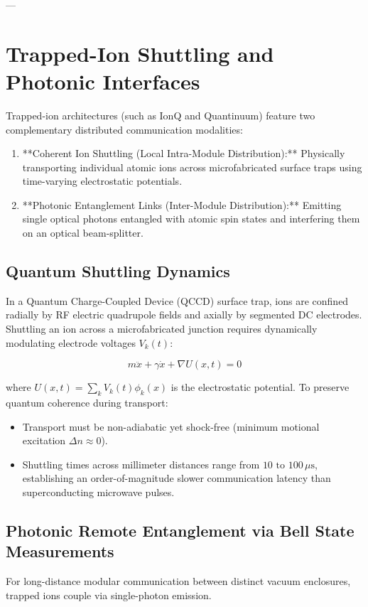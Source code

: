 ---

\section{Trapped-Ion Shuttling and Photonic Interfaces}

Trapped-ion architectures (such as IonQ and Quantinuum) feature two complementary distributed communication modalities:
\begin{enumerate}
    \item **Coherent Ion Shuttling (Local Intra-Module Distribution):** Physically transporting individual atomic ions across microfabricated surface traps using time-varying electrostatic potentials.
    \item **Photonic Entanglement Links (Inter-Module Distribution):** Emitting single optical photons entangled with atomic spin states and interfering them on an optical beam-splitter.
\end{enumerate}

\subsection{Quantum Shuttling Dynamics}
In a Quantum Charge-Coupled Device (QCCD) surface trap, ions are confined radially by RF electric quadrupole fields and axially by segmented DC electrodes. Shuttling an ion across a microfabricated junction requires dynamically modulating electrode voltages $V_k(t)$:

\begin{equation}
    m \ddot{x} + \gamma \dot{x} + \nabla U(x, t) = 0
\end{equation}

where $U(x, t) = \sum_k V_k(t) \phi_k(x)$ is the electrostatic potential. To preserve quantum coherence during transport:
\begin{itemize}
    \item Transport must be non-adiabatic yet shock-free (minimum motional excitation $\Delta n \approx 0$).
    \item Shuttling times across millimeter distances range from $10\text{ to }100\,\mu\text{s}$, establishing an order-of-magnitude slower communication latency than superconducting microwave pulses.
\end{itemize}

\subsection{Photonic Remote Entanglement via Bell State Measurements}
For long-distance modular communication between distinct vacuum enclosures, trapped ions couple via single-photon emission. 

